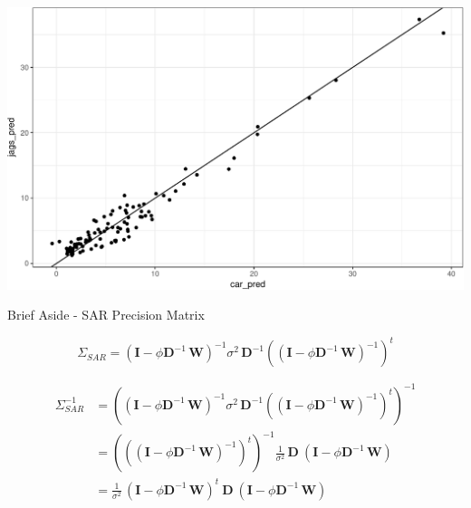 \documentclass[11pt,ignorenonframetext,]{beamer}
\begin{document}
\begin{frame}{}

\includegraphics{Lec19_files/figure-beamer/unnamed-chunk-18-1.pdf}

\end{frame}

\begin{frame}{Brief Aside - SAR Precision Matrix}

\[ 
\Sigma_{SAR} = (\bm{I}-\phi \bm{D}^{-1} \, \bm{W})^{-1} \sigma^2 \, \bm{D}^{-1} \left((\bm{I}-\phi \bm{D}^{-1} \, \bm{W})^{-1}\right)^t
\]

\vspace{6mm}

\[ \begin{aligned}
\Sigma^{-1}_{SAR} 
  &= \left( (\bm{I}-\phi \bm{D}^{-1} \, \bm{W})^{-1} \sigma^2 \, \bm{D}^{-1} \left((\bm{I}-\phi \bm{D}^{-1} \, \bm{W})^{-1}\right)^t \right)^{-1} \\
  &= \left( \left( (\bm{I}-\phi \bm{D}^{-1} \, \bm{W})^{-1}\right)^t\right)^{-1} \frac{1}{\sigma^2} \, \bm{D} ~ (\bm{I}-\phi \bm{D}^{-1} \, \bm{W}) \\
  &= \frac{1}{\sigma^2} \, (\bm{I}-\phi \bm{D}^{-1} \, \bm{W})^t ~ \bm{D} ~ (\bm{I}-\phi \bm{D}^{-1} \, \bm{W}) \\
\end{aligned}\]

\end{frame}
\end{document}
